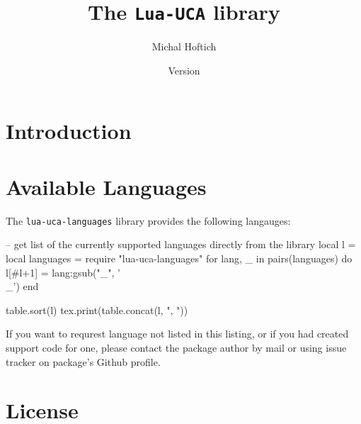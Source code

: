 \documentclass{ltxdoc}
\title{The \texttt{Lua-UCA} library}
\author{Michal Hoftich\authormail{michal.h21@gmail.com}}
\date{Version \version\\\gitdate}
\begin{document}
\maketitle
\tableofcontents
\section{Introduction}

\section{Available Languages}

The \texttt{lua-uca-languages} library provides the following langauges:
\bgroup\ttfamily
\begin{luacode*}
-- get list of the currently supported languages directly from the library
local l = {}
local languages = require "lua-uca-languages"
for lang, _ in pairs(languages) do
l[#l+1] = lang:gsub("_", '\\_')
end

table.sort(l)
tex.print(table.concat(l, ", "))
\end{luacode*}
\egroup

If you want to requrest  language not listed in this listing, or if you had
created support code for one, please contact the package author by mail or using
issue tracker on package's Github profile.


\section{License}
\end{document}
